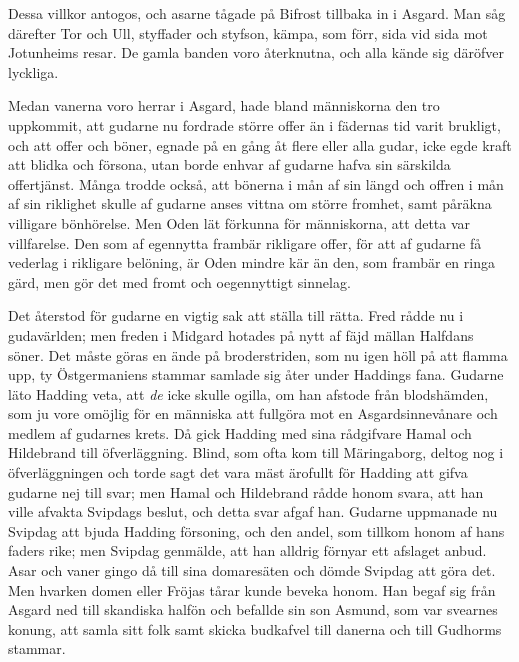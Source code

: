 \protect\hypertarget{lb1625905.xhtmlux5cux23start164}{}{}\protect\hypertarget{lb1625905.xhtmlux5cux23start164-a}{}{}\protect\hypertarget{lb1625905.xhtmlux5cux23start164-b}{}{}\protect\hypertarget{lb1625905.xhtmlux5cux23start164-c}{}{}\protect\hypertarget{lb1625905.xhtmlux5cux23start164-d}{}{}

Dessa villkor antogos, och asarne tågade på Bifrost tillbaka in i
Asgard. Man såg därefter Tor och Ull, styffader och styfson, kämpa, som
förr, sida vid sida mot Jotunheims resar. De gamla banden voro
återknutna, och alla kände sig däröfver lyckliga.

Medan vanerna voro herrar i Asgard, hade bland människorna den tro
uppkommit, att gudarne nu fordrade större offer än i fädernas tid varit
brukligt, och att offer och böner, egnade på en gång åt flere eller alla
gudar, icke egde kraft att blidka och försona, utan borde enhvar af
gudarne hafva sin särskilda offertjänst. Många trodde också, att bönerna
i mån af sin längd och offren i mån af sin riklighet skulle af gudarne
anses vittna om större fromhet, samt påräkna villigare bönhörelse. Men
Oden lät förkunna för människorna, att detta var villfarelse. Den som af
egennytta frambär rikligare offer, för att af gudarne få vederlag i
rikligare belöning, är Oden mindre kär än den, som frambär en ringa
gärd, men gör det med fromt och oegennyttigt sinnelag.

Det återstod för gudarne en vigtig sak att ställa till rätta. Fred rådde
nu i gudavärlden; men freden i Midgard hotades på nytt af fäjd mällan
Halfdans söner. Det måste göras en ände på broderstriden, som nu igen
höll på att flamma upp, ty Östgermaniens stammar samlade sig åter under
Haddings fana. Gudarne läto Hadding veta, att \emph{de} icke skulle
ogilla, om han afstode från blodshämden, som ju vore omöjlig för en
människa att fullgöra mot en Asgardsinnevånare och medlem af gudarnes
krets. Då gick Hadding med sina rådgifvare Hamal och Hildebrand till
öfverläggning. Blind, som ofta kom till Märingaborg, deltog nog i
öfverläggningen och torde sagt det vara mäst ärofullt för Hadding att
gifva gudarne nej till svar; men Hamal och Hildebrand rådde honom svara,
att han ville afvakta Svipdags beslut, och detta svar afgaf han. Gudarne
uppmanade nu Svipdag att bjuda Hadding försoning, och den andel, som
tillkom honom af hans faders rike; men Svipdag genmälde, att han alldrig
förnyar ett afslaget anbud. Asar och vaner gingo då till sina
domaresäten och dömde
\protect\hypertarget{lb1625905.xhtmlux5cux23start165}{}{}\protect\hypertarget{lb1625905.xhtmlux5cux23start165-a}{}{}\protect\hypertarget{lb1625905.xhtmlux5cux23start165-b}{}{}\protect\hypertarget{lb1625905.xhtmlux5cux23start165-c}{}{}\protect\hypertarget{lb1625905.xhtmlux5cux23start165-d}{}{}
Svipdag att göra det. Men hvarken domen eller Fröjas tårar kunde beveka
honom. Han begaf sig från Asgard ned till skandiska halfön och befallde
sin son Asmund, som var svearnes konung, att samla sitt folk samt skicka
budkafvel till danerna och till Gudhorms stammar.

